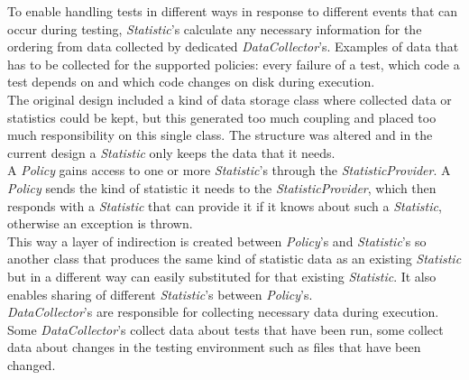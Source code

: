 \documentclass[i2]{oss}
\newcommand{\class}[1]{\emph{#1}}
\begin{document}
To enable handling tests in different ways in response to different 
events that can occur during testing, \class{Statistic}'s calculate any 
necessary information for the ordering from data collected by dedicated 
\class{DataCollector}'s. %
Examples of data that has to be collected for the supported policies: 
every failure of a test, which code a test depends on and which code 
changes on disk during execution.\\

The original design included a kind of data storage class where collected
data or statistics could be kept, but this generated too much coupling
and placed too much responsibility on this single class.
The structure was altered and in the current design a \class{Statistic}
only keeps the data that it needs.\\

A \class{Policy} gains access to one or more \class{Statistic}'s through
the \class{StatisticProvider}.
A \class{Policy} sends the kind of statistic it needs to the 
\class{StatisticProvider}, which then responds with a \class{Statistic}
that can provide it if it knows about such a \class{Statistic}, otherwise
an exception is thrown.\\
This way a layer of indirection is created between \class{Policy}'s and
\class{Statistic}'s so another class that produces the same kind of 
statistic data as an existing \class{Statistic} but in a different way 
can easily substituted for that existing \class{Statistic}. 
It also enables sharing of different \class{Statistic}'s between 
\class{Policy}'s. \\

\class{DataCollector}'s are responsible for collecting necessary data 
during execution.
Some \class{DataCollector}'s collect data about tests that have been run,
some collect data about changes in the testing environment such as files that have been changed.\\
\end{document}
